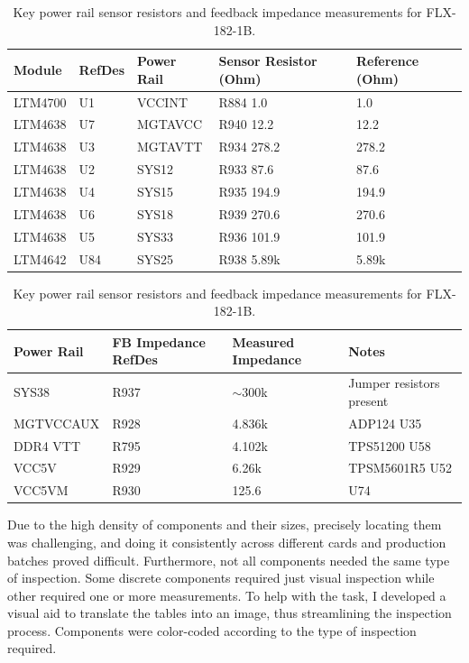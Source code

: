\begin{table}[H]
\centering
\caption{Key power rail sensor resistors and feedback impedance measurements for FLX-182-1B.}
\label{tab:pcb-rail-measurements}
\begin{tabular}{|l|l|l|l|l|}
\hline
\textbf{Module} & \textbf{RefDes} & \textbf{Power Rail} & \textbf{Sensor Resistor (Ohm)} & \textbf{Reference (Ohm)} \\
\hline
LTM4700 & U1  & VCCINT   & R884 1.0    & 1.0 \\
LTM4638 & U7  & MGTAVCC  & R940 12.2   & 12.2 \\
LTM4638 & U3  & MGTAVTT  & R934 278.2  & 278.2 \\
LTM4638 & U2  & SYS12    & R933 87.6   & 87.6 \\
LTM4638 & U4  & SYS15    & R935 194.9  & 194.9 \\
LTM4638 & U6  & SYS18    & R939 270.6  & 270.6 \\
LTM4638 & U5  & SYS33    & R936 101.9  & 101.9 \\
LTM4642 & U84 & SYS25    & R938 5.89k  & 5.89k \\
\hline
\end{tabular}

\vspace{1em}

\begin{tabular}{|l|l|l|l|}
\hline
\textbf{Power Rail} & \textbf{FB Impedance RefDes} & \textbf{Measured Impedance} & \textbf{Notes} \\
\hline
SYS38        & R937  & $\sim$300k    & Jumper resistors present \\
MGTVCCAUX    & R928  & 4.836k        & ADP124 U35 \\
DDR4 VTT     & R795  & 4.102k        & TPS51200 U58 \\
VCC5V        & R929  & 6.26k         & TPSM5601R5 U52 \\
VCC5VM       & R930  & 125.6         & U74 \\
\hline
\end{tabular}
\end{table}

Due to the high density of components and their sizes, precisely locating them was challenging, and doing it consistently across different cards and production batches proved difficult. Furthermore, not all components needed the same type of inspection. Some discrete components required just visual inspection while other required one or more measurements. To help with the task, I developed a visual aid to translate the tables into an image, thus streamlining the inspection process. Components were color-coded according to the type of inspection required.

